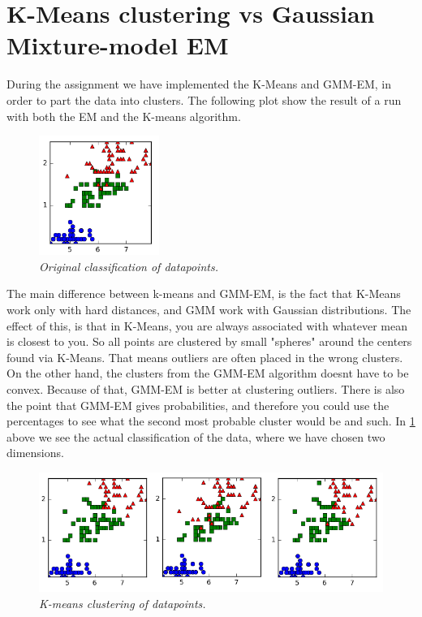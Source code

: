 \documentclass[a4paper,10pt,article,oneside,english]{memoir}
\let\oldcaption\caption
\renewcommand{\caption}[1]{\oldcaption{\emph{#1}}}
\begin{document}
\section*{K-Means clustering vs Gaussian Mixture-model EM}
During the assignment we have implemented the K-Means and GMM-EM, in order to part the data into clusters. The following plot show the result of a run with both the EM and the K-means algorithm.
\begin{figure}
	\centering
	\includegraphics[width=0.35\textwidth]{original.png}
	\caption{Original classification of datapoints.}
	\label{fig:orig}
\end{figure}
The main difference between k-means and GMM-EM, is the fact that K-Means work only with hard distances, and GMM work with Gaussian distributions. The effect of this, is that in K-Means, you are always associated with whatever mean is closest to you. So all points are clustered by small "spheres" around the centers found via K-Means. That means outliers are often placed in the wrong clusters. On the other hand, the clusters from the GMM-EM algorithm doesnt have to be convex. Because of that, GMM-EM is better at clustering outliers.
There is also the point that GMM-EM gives probabilities, and therefore you could use the percentages to see what the second most probable cluster would be and such.
In \ref{fig:orig} above we see the actual classification of the data, where we have chosen two dimensions.
\begin{figure}
	\centering
	\includegraphics[width=\textwidth]{kmeans1.png}
	\caption{K-means clustering of datapoints.}
	\label{fig:km}
\end{figure}
\end{document}
